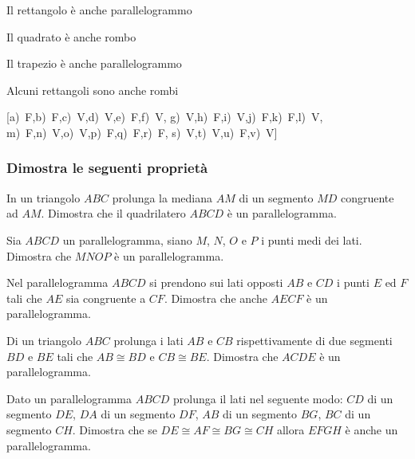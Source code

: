 \begin{esercizio}
\begin{enumeratea}
\item Il rettangolo è anche parallelogrammo\hfill\boxV\quad\boxF
\item Il quadrato è anche rombo\hfill\boxV\quad\boxF
\item Il trapezio è anche parallelogrammo\hfill\boxV\quad\boxF
\item Alcuni rettangoli sono anche rombi\hfill\boxV\quad\boxF
\end{enumeratea}
\hfill[a)~F,\quad b)~F,\quad c)~V,\quad d)~V,\quad e)~F,\quad f)~V,\quad 
g)~V,\quad h)~F,\quad i)~V,\quad j)~F,\quad k)~F,\quad l)~V,\quad 
m)~F,\quad n)~V,\quad o)~V,\quad p)~F,\quad q)~F,\quad r)~F,\quad 
s)~V,\quad t)~V,\quad u)~F,\quad v)~V]
\end{esercizio}

\begin{multicols}{2}

\subsubsection*{Dimostra le seguenti proprietà}

\begin{esercizio}
	\label{ese:4.10}
	In un triangolo $ABC$ prolunga la mediana $AM$ di un segmento $MD$ 
	congruente ad $AM$. Dimostra che il quadrilatero $ABCD$ è un 
	parallelogramma.
\end{esercizio}

\begin{esercizio}
	\label{ese:4.11}
	Sia $ABCD$ un parallelogramma, siano $M$, $N$, $O$ e $P$ i punti medi 
	dei lati. Dimostra che $MNOP$ è un parallelogramma.
\end{esercizio}

\begin{esercizio}
	\label{ese:4.13}
	Nel parallelogramma $ABCD$ si prendono sui lati opposti $AB$ e $CD$ i 
	punti $E$ ed $F$ tali che $AE$ sia congruente a $CF$. Dimostra che 
	anche $AECF$ è un parallelogramma.
\end{esercizio}

\begin{esercizio}
	\label{ese:4.14}
	Di un triangolo $ABC$ prolunga i lati $AB$ e $CB$ rispettivamente di 
	due segmenti $BD$ e $BE$ tali che $AB\cong BD$ e $CB\cong BE$. 
	Dimostra che $ACDE$ è un parallelogramma.
\end{esercizio}

\begin{esercizio}
	\label{ese:4.17}
	Dato un parallelogramma $ABCD$ prolunga il lati nel seguente modo: 
	$CD$ di un segmento $DE$, $DA$ di un segmento $DF$, $AB$ di un 
	segmento $BG$, $BC$ di un segmento $CH$. Dimostra che se $DE\cong 
	AF\cong BG\cong CH$ allora $EFGH$ è anche un parallelogramma.
\end{esercizio}


\end{multicols}
